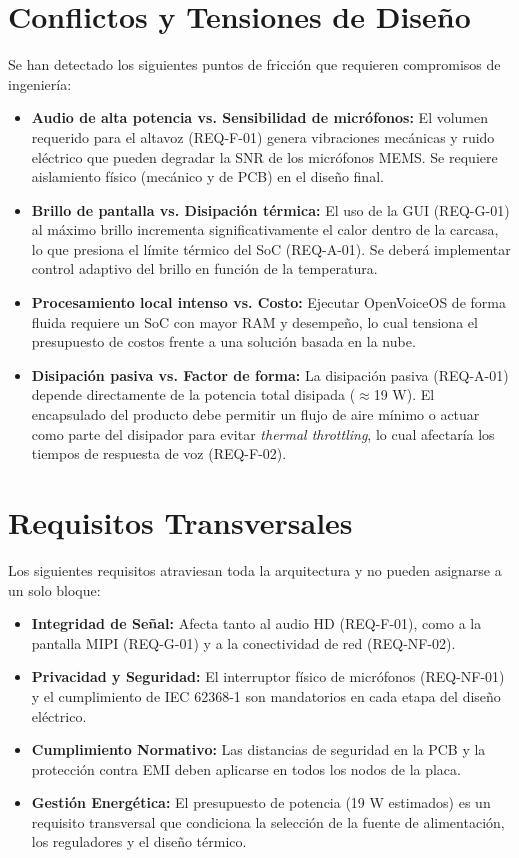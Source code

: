 \documentclass[%
	paper=a4,
	twoside=false,
	parskip=half,
	chapterprefix=false,
	10pt,
	headings=normal,
	bibliography=totoc,
	listof=totoc,
	titlepage=on,
	captions=tableabove,
	draft=false,
]{scrbook}%
\begin{document}
\section{Conflictos y Tensiones de Diseño}

Se han detectado los siguientes puntos de fricción que requieren compromisos de ingeniería:

\begin{itemize}
    \item \textbf{Audio de alta potencia vs. Sensibilidad de micrófonos:} El volumen requerido para el altavoz (REQ-F-01) genera vibraciones mecánicas y ruido eléctrico que pueden degradar la SNR de los micrófonos MEMS. Se requiere aislamiento físico (mecánico y de PCB) en el diseño final.
    \item \textbf{Brillo de pantalla vs. Disipación térmica:} El uso de la GUI (REQ-G-01) al máximo brillo incrementa significativamente el calor dentro de la carcasa, lo que presiona el límite térmico del SoC (REQ-A-01). Se deberá implementar control adaptivo del brillo en función de la temperatura.
    \item \textbf{Procesamiento local intenso vs. Costo:} Ejecutar OpenVoiceOS de forma fluida requiere un SoC con mayor RAM y desempeño, lo cual tensiona el presupuesto de costos frente a una solución basada en la nube.
    \item \textbf{Disipación pasiva vs. Factor de forma:} La disipación pasiva (REQ-A-01) depende directamente de la potencia total disipada ($\approx$19 W). El encapsulado del producto debe permitir un flujo de aire mínimo o actuar como parte del disipador para evitar \textit{thermal throttling}, lo cual afectaría los tiempos de respuesta de voz (REQ-F-02).
\end{itemize}

\section{Requisitos Transversales}

Los siguientes requisitos atraviesan toda la arquitectura y no pueden asignarse a un solo bloque:

\begin{itemize}
    \item \textbf{Integridad de Señal:} Afecta tanto al audio HD (REQ-F-01), como a la pantalla MIPI (REQ-G-01) y a la conectividad de red (REQ-NF-02).
    \item \textbf{Privacidad y Seguridad:} El interruptor físico de micrófonos (REQ-NF-01) y el cumplimiento de IEC 62368-1 \cite{iec62368} son mandatorios en cada etapa del diseño eléctrico.
    \item \textbf{Cumplimiento Normativo:} Las distancias de seguridad en la PCB y la protección contra EMI deben aplicarse en todos los nodos de la placa.
    \item \textbf{Gestión Energética:} El presupuesto de potencia (19 W estimados) es un requisito transversal que condiciona la selección de la fuente de alimentación, los reguladores y el diseño térmico.
\end{itemize}
\end{document}
